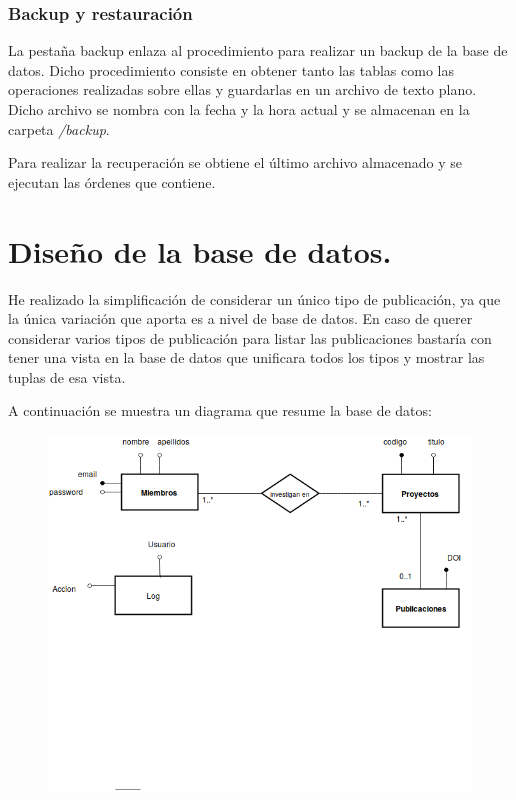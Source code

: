 \documentclass[a4paper, 11pt]{article} %
\begin{document}
\subsubsection{Backup y restauración} La pestaña backup enlaza al procedimiento para realizar un backup de la base de datos. Dicho procedimiento consiste en obtener tanto las tablas como las operaciones realizadas sobre ellas y guardarlas en un archivo de texto plano. Dicho archivo se nombra con la fecha y la hora actual y se almacenan en la carpeta \emph{/backup}. 
\medskip

Para realizar la recuperación se obtiene el último archivo almacenado y se ejecutan las órdenes que contiene.
 
\section{Diseño de la base de datos.}
He realizado la simplificación de considerar un único tipo de publicación, ya que la única variación que aporta es a nivel de base de datos. En caso de querer considerar varios tipos de publicación para listar las publicaciones bastaría con tener una vista en la base de datos que unificara todos los tipos y mostrar las tuplas de esa vista. 
\medskip

A continuación se muestra un diagrama que resume la base de datos:
\begin{figure}[H]
	\includegraphics[scale=0.65]{./diagrama_er.png}
\end{figure}
\end{document}
